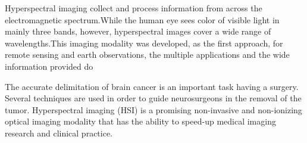 Hyperspectral imaging collect and process information from across the electromagnetic spectrum.While the human eye sees color of visible light in mainly three bands, however, hyperspectral images cover a wide range of wavelengths.This imaging modality was developed, as the first approach, for remote sensing and earth observations, the multiple applications and the wide information provided do 

The accurate delimitation of brain cancer is an important task having a surgery. Several techniques are used in order to guide neurosurgeons in the removal of the tumor. Hyperspectral imaging (HSI) is a promising non-invasive and non-ionizing optical imaging modality that has the ability to speed-up medical imaging research and clinical practice. 

